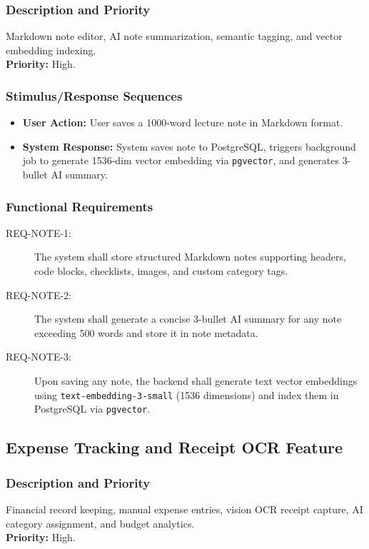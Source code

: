 \documentclass[11pt,a4paper]{article}
\begin{document}
\subsubsection{Description and Priority}
Markdown note editor, AI note summarization, semantic tagging, and vector embedding indexing. \\
\textbf{Priority:} High.

\subsubsection{Stimulus/Response Sequences}
\begin{itemize}
    \item \textbf{User Action:} User saves a 1000-word lecture note in Markdown format.
    \item \textbf{System Response:} System saves note to PostgreSQL, triggers background job to generate 1536-dim vector embedding via \texttt{pgvector}, and generates 3-bullet AI summary.
\end{itemize}

\subsubsection{Functional Requirements}
\begin{description}
    \item[REQ-NOTE-1:] The system shall store structured Markdown notes supporting headers, code blocks, checklists, images, and custom category tags.
    \item[REQ-NOTE-2:] The system shall generate a concise 3-bullet AI summary for any note exceeding 500 words and store it in note metadata.
    \item[REQ-NOTE-3:] Upon saving any note, the backend shall generate text vector embeddings using \texttt{text-embedding-3-small} (1536 dimensions) and index them in PostgreSQL via \texttt{pgvector}.
\end{description}

\subsection{Expense Tracking and Receipt OCR Feature}
\subsubsection{Description and Priority}
Financial record keeping, manual expense entries, vision OCR receipt capture, AI category assignment, and budget analytics. \\
\textbf{Priority:} High.
\end{document}

